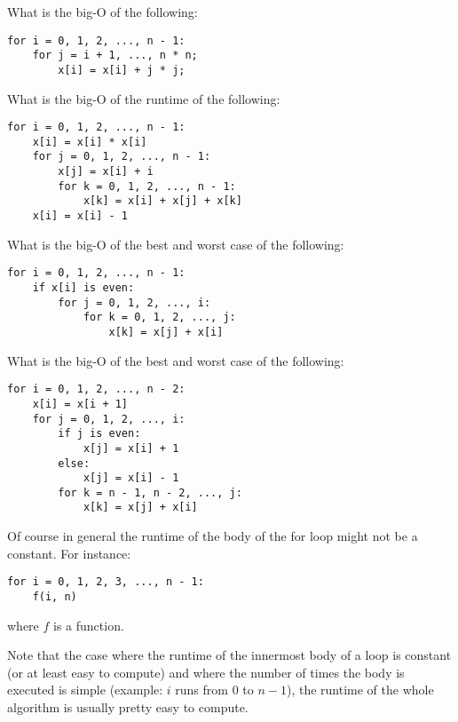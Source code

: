 \begin{ex}
What is the big-O of the following:
\begin{Verbatim}[frame=single, fontsize=\footnotesize]
for i = 0, 1, 2, ..., n - 1:
    for j = i + 1, ..., n * n;
        x[i] = x[i] + j * j;
\end{Verbatim}
\end{ex}


\begin{ex}
What is the big-O of the runtime of the following:
\begin{Verbatim}[frame=single, fontsize=\footnotesize]
for i = 0, 1, 2, ..., n - 1:
    x[i] = x[i] * x[i]
    for j = 0, 1, 2, ..., n - 1:
        x[j] = x[i] + i 
        for k = 0, 1, 2, ..., n - 1:
            x[k] = x[i] + x[j] + x[k]
    x[i] = x[i] - 1
\end{Verbatim}
\end{ex}


\begin{ex}
What is the big-O of the best and worst case of the following:
\begin{Verbatim}[frame=single, fontsize=\footnotesize]
for i = 0, 1, 2, ..., n - 1:
    if x[i] is even:
        for j = 0, 1, 2, ..., i:
            for k = 0, 1, 2, ..., j:
                x[k] = x[j] + x[i]
\end{Verbatim}
\end{ex}


\begin{ex}
What is the big-O of the best and worst case of the following:
\begin{Verbatim}[frame=single, fontsize=\footnotesize]
for i = 0, 1, 2, ..., n - 2:
    x[i] = x[i + 1]
    for j = 0, 1, 2, ..., i:
        if j is even:
            x[j] = x[i] + 1
        else:
            x[j] = x[i] - 1
        for k = n - 1, n - 2, ..., j:
            x[k] = x[j] + x[i]
\end{Verbatim}
\end{ex}



Of course in general the runtime of the body of the for loop
might not be a constant.
For instance: 
\begin{Verbatim}[frame=single, fontsize=\footnotesize]
for i = 0, 1, 2, 3, ..., n - 1:
    f(i, n)
\end{Verbatim}
where $f$ is a function.

Note that the case where the runtime 
of the innermost body of a loop is constant
(or at least easy to compute) and where the number of times the body
is executed is simple (example: $i$ runs from $0$ to $n-1$),
the runtime of the whole algorithm is usually pretty easy to compute.

